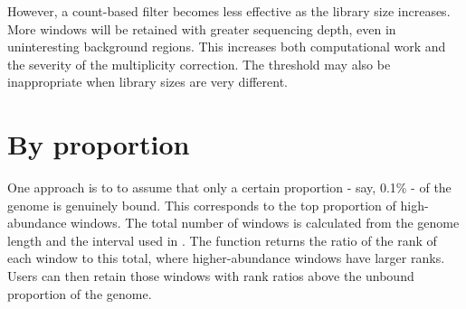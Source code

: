 \documentclass{report}\usepackage[]{graphicx}\usepackage[usenames,dvipsnames]{color}
\newcommand{\hlnum}[1]{\textcolor[rgb]{0.816,0.125,0.439}{#1}}%
\newcommand{\hlstr}[1]{\textcolor[rgb]{0.251,0.627,0.251}{#1}}%
\newcommand{\hlopt}[1]{\textcolor[rgb]{0,0,0}{#1}}%
\newcommand{\hlstd}[1]{\textcolor[rgb]{0.251,0.251,0.251}{#1}}%
\newcommand{\hlkwb}[1]{\textcolor[rgb]{0,0,0}{#1}}%
\newcommand{\hlkwc}[1]{\textcolor[rgb]{0.251,0.251,0.251}{#1}}%
\newcommand{\hlkwd}[1]{\textcolor[rgb]{0.878,0.439,0.125}{#1}}%
\newenvironment{knitrout}{}{} %
\begin{document}
\begin{knitrout}
\color{fgcolor}
\end{knitrout}

However, a count-based filter becomes less effective as the library size increases.
More windows will be retained with greater sequencing depth, even in uninteresting background regions.
This increases both computational work and the severity of the multiplicity correction.
The threshold may also be inappropriate when library sizes are very different.

\section{By proportion}
One approach is to to assume that only a certain proportion - say, 0.1\% - of the genome is genuinely bound. 
This corresponds to the top proportion of high-abundance windows.
The total number of windows is calculated from the genome length and the  interval used in . 
The  function returns the ratio of the rank of each window to this total, where higher-abundance windows have larger ranks.
Users can then retain those windows with rank ratios above the unbound proportion of the genome.

\begin{knitrout}
\color{fgcolor}
\end{knitrout}
\end{document}
